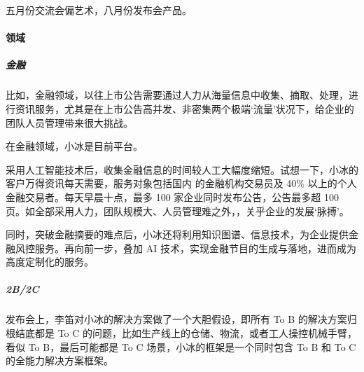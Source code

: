 \documentclass[letterpaper,11pt,english]{sphinxmanual}
\begin{document}
五月份交流会偏艺术，八月份发布会产品。


\paragraph{领域}
\label{\detokenize{chapter_company/xiaoice:id10}}

\subparagraph{金融}
\label{\detokenize{chapter_company/xiaoice:id11}}
比如，金融领域，以往上市公告需要通过人力从海量信息中收集、摘取、处理，进行资讯服务，尤其是在上市公告高并发、非密集两个极端‘流量’状况下，给企业的团队人员管理带来很大挑战。

在金融领域，小冰是目前平台。%
\begin{footnote}[939]\sphinxAtStartFootnote
{}
%
\end{footnote}

采用人工智能技术后，收集金融信息的时间较人工大幅度缩短。试想一下，小冰的客户万得资讯每天需要，服务对象包括国内 的金融机构交易员及 40\%
以上的个人金融交易者。每天早晨十点，最多 100
家企业同时发布公告，公告最多超 100
页。如全部采用人力，团队规模大、人员管理难之外，，关乎企业的发展‘脉搏’。

同时，突破金融摘要的难点后，小冰还将利用知识图谱、信息技术，为企业提供金融风控服务。再向前一步，叠加
AI 技术，实现金融节目的生成与落地，进而成为高度定制化的服务。


\subparagraph{2B/2C}
\label{\detokenize{chapter_company/xiaoice:b-2c}}
发布会上，李笛对小冰的解决方案做了一个大胆假设，即所有 To B
的解决方案归根结底都是 To C
的问题，比如生产线上的仓储、物流，或者工人操控机械手臂，看似 To
B，最后可能都是 To C 场景，小冰的框架是一个同时包含 To B 和 To C
的全能力解决方案框架。
\end{document}
